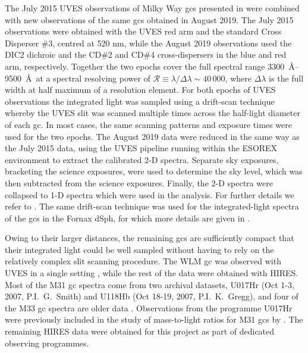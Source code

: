 \documentclass{aa}
\begin{document}
The July 2015 UVES observations of Milky Way \acp{gc} presented in \citet[][hereafter L2017]{Larsen2017} were combined with new observations of the same \acp{gc} obtained in August 2019. The July 2015 observations were obtained with the UVES red arm and the standard Cross Disperser \#3, centred at 520 nm, while the August 2019 observations used the DIC2 dichroic and the CD\#2 and CD\#4 cross-dispersers in the blue and red arm, respectively. Together the two epochs cover the full spectral range 3300~\AA --9500~\AA\ at a spectral resolving power of $\mathcal{R}\equiv\lambda/\Delta \lambda\sim40\, 000$, where $\Delta \lambda$ is the full width at half maximum of a resolution element. For both epochs of UVES observations the integrated light was sampled using a drift-scan technique whereby the UVES slit was scanned multiple times across the half-light diameter of each \ac{gc}. In most cases, the same scanning patterns and exposure times were used for the two epochs.
The August 2019 data were reduced in the same way as the July 2015 data, using the UVES pipeline running within the ESOREX environment to extract the calibrated 2-D spectra. 
Separate sky exposures, bracketing the science exposures, were used to determine the sky level, which was then subtracted from the science exposures. Finally, the 2-D spectra were collapsed to 1-D spectra which were used in the analysis. For further details we refer to . The same drift-scan technique was used for the integrated-light spectra of the \acp{gc} in the Fornax dSph, for which more details are given in \citet{Larsen2012a}.

Owing to their larger distances, the remaining \acp{gc} are sufficiently compact that their integrated light could be well sampled without having to rely on the relatively complex slit scanning procedure. The WLM \ac{gc} was observed with UVES in a single setting \citep{Larsen2014}, while the rest of the data were obtained with HIRES.
Most of the M31 \ac{gc} spectra come from two archival datasets, U017Hr (Oct 1-3, 2007, P.I.\ G.\ Smith) and U118Hb (Oct 18-19, 2007, P.I.\ K.\ Gregg), and four of the M33 \ac{gc} spectra are older data \citep{Larsen2002b}. Observations from the programme U017Hr were previously included in the study of mass-to-light ratios for M31 \acp{gc} by \citet{Strader2009}. The remaining HIRES data were obtained for this project as part of dedicated observing programmes. 
\end{document}
